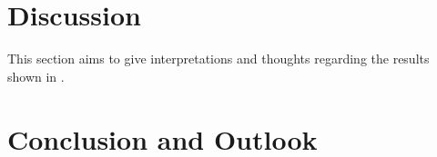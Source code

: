 \clearpage
\section{Discussion}
\label{sec:discussion}

This section aims to give interpretations and thoughts regarding the results shown in .


\clearpage
\section{Conclusion and Outlook}
\label{sec:outlook}

